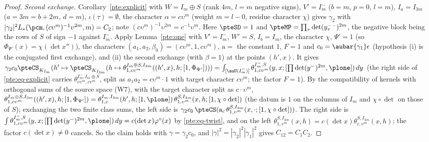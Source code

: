 \documentclass[10pt]{amsart}
\theoremstyle{definition}
\theoremstyle{remark}
\begin{document}
\begin{proof}
\emph{Second exchange.} Corollary~\ref{pte:explicit} with $W=I_m\oplus S$ (rank $4m$, $l=m$ negative
signs), $V'=I_m^-$ ($b=m$, $p=0$, $l=m$), $I_a=I_{3m}$ ($a=3m=b+2m$, $d=m$), $\iota(\tau)=\emptyset$, the
character $\alpha=c\upsilon^m$ (weight $m=l-0$, residue character $\chi$) gives $\gamma_2$ with
$|\gamma_2|^2L_*(\pcm,(c\upsilon^m)^{-1}\upsilon^{2m},m)=C_2$; note $(c\upsilon^m)^{-1}\upsilon^{2m}=c^{-1}\upsilon^m$.
Here $\pteSD=1$ and $\pteMP=\prod_\tau\det(y^{--}_\tau)^{2m}$, the negative block being the rows of $S$ of
sign $-1$ against $I_m^-$. Apply Lemma~\ref{pte:one} with $V'=I_m^-$, $W'=S$, $I_b=I_m$, the character
$\chi$, $\Psi'=1$ (so $\Phi_{\Psi'}(x)=\chi(\det x'')$), the characters $(a_1,a_2,\beta_0)=(c\upsilon^m,1,c\upsilon^m)$, $\mathrm a=$ the constant $1$, $F=1$ and $c_0=\aubar{\gamma_1}\epsilon$
(hypothesis (i) is the conjugated first exchange), and (ii) the second exchange (with $\beta=1$) at the
points $(h',x)$. It gives $\gamma_2c_0\pteCS_{K_{I_m}}(h'\mapsto\pteCS_{K_{I_{3m}}}(h\mapsto\theta^{I_m\oplus
S,I_{3m}}_{1,c\upsilon^m}((h',x),h;[1,\Phi_{\Psi'}])))=\int_{[\auU(I_m^-)]}\theta^{I_m^-,S}_{1,c\upsilon^m}(y,x;
[\prod\det(y^-)^{2m},\plone])\,dy$ (the right side of \eqref{pte:eq-explicit} carries $\theta^{I_m^-,I_m\oplus S}_{c\upsilon^m,c\upsilon^m}$, split as
$a_1a_2=c\upsilon^m\cdot1$ with target character $c\upsilon^m$; the factor $F=1$).
By the compatibility of kernels with orthogonal sums of the source space (W7), with the target character split
as $c\cdot\upsilon^m$, $\theta^{I_m\oplus S,I_{3m}}_{1,c\upsilon^m}((h',x),h;[1,\Phi_{\Psi'}])=\theta^{I_m,I_{3m}}_{1,c}
(h',h;[1,\plone])\,\theta^{S,I_{3m}}_{1,\upsilon^m}(x,h;[1,\chi\circ\det])$ (the datum is $1$ on the columns of
$I_m$ and $\chi\circ\det$ on those of $S$); exchanging the two finite class sums, the left side is
$\gamma_2c_0\,\pteCS(\mathrm a_c\,\theta^{S,I_{3m}}_{1,\upsilon^m}(x,\cdot;[1,\chi\circ\det]))$. The right side is
$\int\theta^{I_m^-,S}_{1,c\upsilon^m}(y,x;[\prod\det(y^-)^{2m},\plone])\,dy=c(\det x)\varphi^\circ(x)$ by
\eqref{pte:eq-twist}, and on the left $\theta^{S,I_{3m}}_{1,\upsilon^m}(x,h)=c(\det x)\theta^{S,I_{3m}}_{c,\upsilon^m}(x,h)$;
the factor $c(\det x)\ne0$ cancels. So the claim holds with $\gamma=\gamma_2c_0$, and $|\gamma|^2=|\gamma_2|^2|\gamma_1|^2$ gives $C_{12}=C_1C_2$.
\end{proof}
\end{document}
